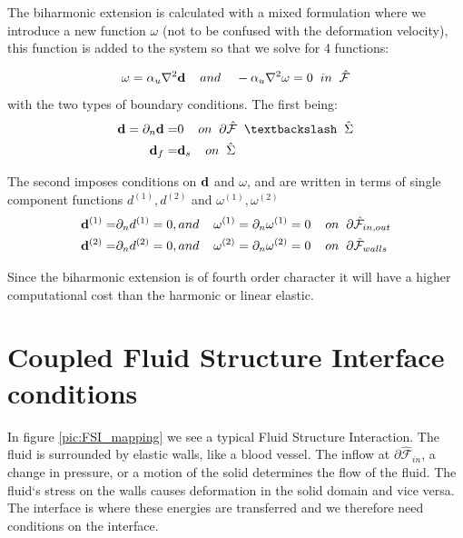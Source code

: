 The biharmonic extension is calculated with a mixed formulation where we introduce a new function $\omega$ (not to be confused with the deformation velocity), this function is added to the system so that we solve for 4 functions:

\begin{equation}
\omega = \alpha_u \nabla^2 \bold{d} \hspace{4mm} and \hspace{4mm} - \alpha_u \nabla^2 \omega = 0 \hspace{2mm}   in \hspace{2mm} \hat{\mathcal{F}}
\end{equation}
with the two types of boundary conditions. The first being:
\begin{align}
\bold{d} = \partial_n \bold{d} =& 0 \hspace{4mm} on \hspace{2mm} \partial \hat{\mathcal{F}} \hspace{2mm} \textbackslash \hspace{2mm} \hat{\Sigma}\\
\bold{d}_f =& \bold{d}_s \hspace{4mm } on \hspace{2mm } \hat{\Sigma} 
\end{align}

The second imposes conditions on $\bold{d}$ and $\omega$, and are written in terms of single component functions $d^{(1)},d^{(2)}$ and $\omega^{(1)}, \omega^{(2)}$	
\begin{align}
\bold{d}^{(1)} =& \partial_n d^{(1)} = 0 , and \hspace{4mm}   \omega^{(1)} = \partial_n \omega^{(1)} = 0    \hspace{4mm} on \hspace{2mm} \partial \hat{\mathcal{F}}_{in,out} \\
\bold{d}^{(2)} =& \partial_n d^{(2)} = 0 , and \hspace{4mm}   \omega^{(2)} = \partial_n \omega^{(2)} = 0    \hspace{4mm} on \hspace{2mm} \partial \hat{\mathcal{F}}_{walls} \\
\end{align}

Since the biharmonic extension is of fourth order character it will have a higher computational cost \cite{Richter2016} than the harmonic or linear elastic. 


\section{Coupled Fluid Structure Interface conditions}
In figure \ref{pic:FSI_mapping} we see a typical Fluid Structure Interaction. The fluid is surrounded by elastic walls, like a blood vessel. The inflow at $\partial \hat{\mathcal{F}}_{in}$, a change in pressure, or a motion of the solid determines the flow of the fluid.
The fluid`s stress on the walls causes deformation in the solid domain and vice versa. The interface is where these energies are transferred and we therefore need conditions on the interface. \newline

